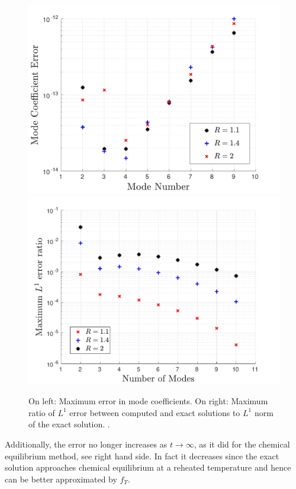 \begin{figure}
\centerline{ \includegraphics[width=0.5\linewidth]{plots/keq_b_err.pdf}\hspace*{-0.5cm}
\includegraphics[width=0.5\linewidth]{plots/keq_L1_err.pdf} }
\caption{On left: Maximum error in mode coefficients. On right: Maximum ratio of $L^1$ error between computed and exact solutions to $L^1$ norm of the exact solution.  .}\label{fig:keqL1Err}
\end{figure}

Additionally, the error no longer increases as $t\rightarrow\infty$, as it did for the chemical equilibrium method, see  right hand side.
In fact it decreases since the exact solution approaches chemical equilibrium at a reheated temperature and hence can be better approximated by $f_\Upsilon$. 


